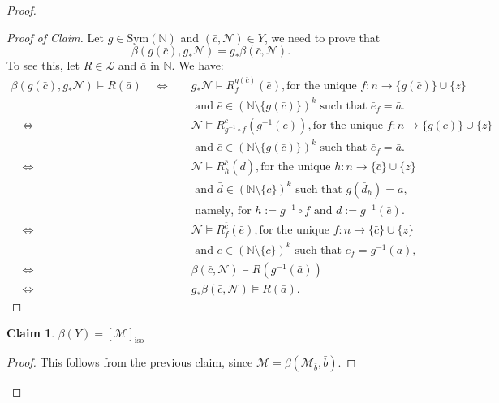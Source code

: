 \documentclass[11pt]{amsart}
\theoremstyle{plain}
\newtheorem{claim}[theorem]{Claim}
\theoremstyle{definition}
\newcommand{\N}{\mathbb{N}}
\begin{document}
\begin{proof}
\begin{proof}[Proof of Claim]
Let $g\in \mathrm{Sym}(\N)$ and $(\bar{c},\mathcal{N})\in Y$, we need to prove that
\[\beta(g (\bar{c}), g_{*}\mathcal{N})= g_* \beta(\bar{c},\mathcal{N}).\]  
To see this, let $R\in \mathcal L$ and  $\bar{a}$ in $\mathbb{N}$. We have:
\begin{align*}
      \beta(g (\bar{c}), g_{*}\mathcal{N}) \models R(\bar{a}) \quad \Leftrightarrow \quad &      {g_{*}\mathcal{N}} \models R^{g(\bar{c})}_{f}(\bar{e}), \text{for the unique }f\colon n\to \{g(\bar{c})\}\cup \{z\}\\ & \text{ and  }
      \bar{e}\in (\N \setminus \{g  (\bar{c})\})^k\text{ such that }\bar{e}_f=\bar{a}.\\
 \quad \Leftrightarrow \quad &      {\mathcal{N}} \models R^{\bar{c}}_{g^{-1}\circ f}(g^{-1}(\bar{e})), \text{for the unique }f\colon n\to \{g(\bar{c})\}\cup \{z\}\\ & \text{ and  }
      \bar{e}\in (\N \setminus \{g  (\bar{c})\})^k\text{ such that }\bar{e}_f=\bar{a}.\\
 \quad \Leftrightarrow \quad &      {\mathcal{N}}\models R^{\bar{c}}_{h}(\bar{d}), \text{for the unique }h\colon n\to \{\bar{c}\}\cup \{z\}\\ & \text{ and  }
      \bar{d}\in (\N \setminus \{\bar{c}\})^k\text{ such that }g(\bar{d}_h)=\bar{a}, \\
      & \text{ namely,  for } h:=g^{-1}\circ f \text{ and } \bar{d}:=g^{-1}(\bar{e}). \\ 
 \quad \Leftrightarrow \quad &      {\mathcal{N}}\models R^{\bar{c}}_{f}(\bar{e}), \text{for the unique } f \colon n\to \{\bar{c}\}\cup \{z\}\\ & \text{ and  }
      \bar{e}\in (\N \setminus \{\bar{c}\})^k\text{ such that } \bar{e}_f=g^{-1}(\bar{a}), \\
   \quad \Leftrightarrow \quad &  \beta(\bar{c},\mathcal{N}) \models R(g^{-1}(\bar{a}))\\
  \quad \Leftrightarrow \quad &   {g_* \beta(\bar{c},\mathcal{N})}\models R(\bar{a}).
\end{align*}
\end{proof}




\begin{claim}\label{Claim:Isom}
  $\beta(Y)= [\mathcal{M}]_{\mathrm{iso}}$
\end{claim}
\begin{proof}
This follows from the previous claim, since $\mathcal{M}=\beta(\mathcal{M}_{\bar{b}},\bar{b})$.
\end{proof}




\end{proof}
\end{document}
